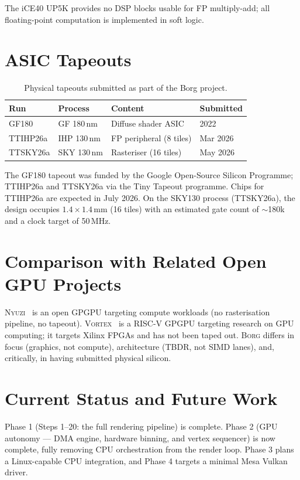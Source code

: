 \documentclass[sigconf,review,natbib=false]{acmart}
\begin{document}
The iCE40 UP5K provides no DSP blocks usable for FP multiply-add;
all floating-point computation is implemented in soft logic.

\section{ASIC Tapeouts}

\begin{table}[h]
  \centering
  \caption{Physical tapeouts submitted as part of the Borg project.}
  \begin{tabular}{@{}llll@{}}
    \toprule
    Run & Process & Content & Submitted \\
    \midrule
    GF180    & GF 180\,nm   & Diffuse shader ASIC    & 2022 \\
    TTIHP26a & IHP 130\,nm  & FP peripheral (8 tiles)    & Mar 2026 \\
    TTSKY26a & SKY 130\,nm  & Rasteriser (16 tiles)    & May 2026 \\
    \bottomrule
  \end{tabular}
\end{table}

The GF180 tapeout was funded by the Google Open-Source Silicon Programme;
TTIHP26a and TTSKY26a via the Tiny Tapeout programme.
Chips for TTIHP26a are expected in July 2026.
On the SKY130 process (TTSKY26a), the design occupies $1.4 \times 1.4$\,mm (16 tiles) with an estimated gate count of $\sim$180k and a clock target of 50\,MHz.

\section{Comparison with Related Open GPU Projects}

\textsc{Nyuzi}~\cite{Bush2015Nyuzi} is an open GPGPU targeting compute
workloads (no rasterisation pipeline, no tapeout).
\textsc{Vortex}~\cite{Vortex2021} is a RISC-V GPGPU targeting research
on GPU computing; it targets Xilinx FPGAs and has not been taped out.
\textsc{Borg} differs in focus (graphics, not compute),
architecture (TBDR, not SIMD lanes), and,
critically, in having submitted physical silicon.

\section{Current Status and Future Work}

Phase 1 (Steps 1–20: the full rendering pipeline) is complete.
Phase 2 (GPU autonomy — DMA engine, hardware binning, and vertex sequencer)
is now complete, fully removing CPU orchestration from the render loop.
Phase 3 plans a Linux-capable CPU integration, and Phase 4 targets
a minimal Mesa Vulkan driver.
\end{document}
